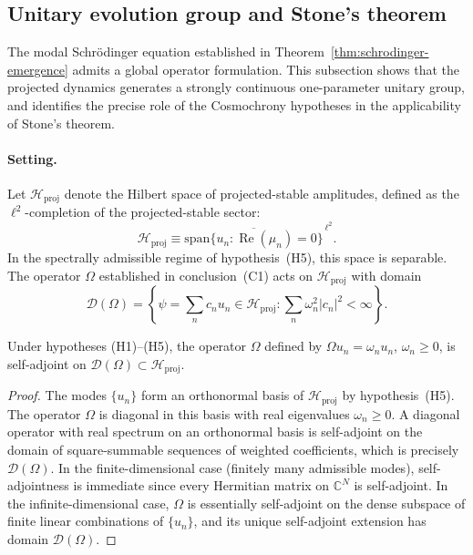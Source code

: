 \subsection{Unitary evolution group and Stone's theorem}
  \label{app:stone-unitary}

  The modal Schr\"{o}dinger equation established in
  Theorem~\ref{thm:schrodinger-emergence} admits a global operator formulation.
  This subsection shows that the projected dynamics generates a strongly continuous
  one-parameter unitary group, and identifies the precise role of the Cosmochrony hypotheses
  in the applicability of Stone's theorem.

  \paragraph{Setting.}

    Let $\mathcal{H}_{\mathrm{proj}}$ denote the Hilbert space of projected-stable amplitudes,
    defined as the $\ell^2$-completion of the projected-stable sector:
    \[
      \mathcal{H}_{\mathrm{proj}}
      \equiv \overline{\mathrm{span}\{u_n : \operatorname{Re}(\mu_n) = 0\}}^{\,\ell^2}.
    \]
    In the spectrally admissible regime of hypothesis~(H5), this space is separable.
    The operator $\Omega$ established in conclusion~(C1) acts on $\mathcal{H}_{\mathrm{proj}}$
    with domain
    \[
      \mathcal{D}(\Omega)
      = \left\{ \psi = \sum_n c_n u_n \in \mathcal{H}_{\mathrm{proj}}
          : \sum_n \omega_n^2 |c_n|^2 < \infty \right\}.
    \]

    \begin{proposition}
      \label{prop:omega-selfadjoint}
      Under hypotheses \textup{(H1)--(H5)}, the operator $\Omega$ defined by
      $\Omega u_n = \omega_n u_n$, $\omega_n \geq 0$, is self-adjoint on
      $\mathcal{D}(\Omega) \subset \mathcal{H}_{\mathrm{proj}}$.
    \end{proposition}

    \begin{proof}
      The modes $\{u_n\}$ form an orthonormal basis of $\mathcal{H}_{\mathrm{proj}}$ by
      hypothesis~(H5).
      The operator $\Omega$ is diagonal in this basis with real eigenvalues $\omega_n \geq 0$.
      A diagonal operator with real spectrum on an orthonormal basis is self-adjoint on the
      domain of square-summable sequences of weighted coefficients, which is precisely
      $\mathcal{D}(\Omega)$.
      In the finite-dimensional case (finitely many admissible modes), self-adjointness is
      immediate since every Hermitian matrix on $\mathbb{C}^N$ is self-adjoint.
      In the infinite-dimensional case, $\Omega$ is essentially self-adjoint on the dense
      subspace of finite linear combinations of $\{u_n\}$, and its unique self-adjoint
      extension has domain $\mathcal{D}(\Omega)$.
    \end{proof}

